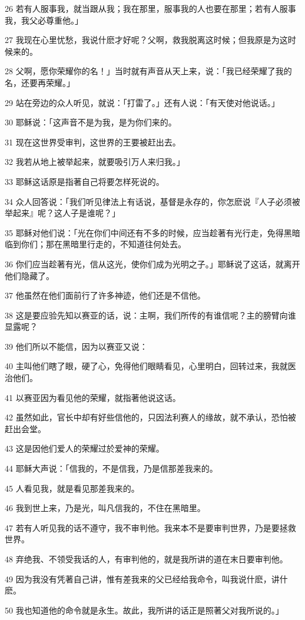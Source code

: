 \par 26 若有人服事我，就当跟从我；我在那里，服事我的人也要在那里；若有人服事我，我父必尊重他。」
\par 27 我现在心里忧愁，我说什麽才好呢？父啊，救我脱离这时候；但我原是为这时候来的。
\par 28 父啊，愿你荣耀你的名！」当时就有声音从天上来，说：「我已经荣耀了我的名，还要再荣耀。」
\par 29 站在旁边的众人听见，就说：「打雷了。」还有人说：「有天使对他说话。」
\par 30 耶稣说：「这声音不是为我，是为你们来的。
\par 31 现在这世界受审判，这世界的王要被赶出去。
\par 32 我若从地上被举起来，就要吸引万人来归我。」
\par 33 耶稣这话原是指著自己将要怎样死说的。
\par 34 众人回答说：「我们听见律法上有话说，基督是永存的，你怎麽说『人子必须被举起来』呢？这人子是谁呢？」
\par 35 耶稣对他们说：「光在你们中间还有不多的时候，应当趁著有光行走，免得黑暗临到你们；那在黑暗里行走的，不知道往何处去。
\par 36 你们应当趁著有光，信从这光，使你们成为光明之子。」耶稣说了这话，就离开他们隐藏了。
\par 37 他虽然在他们面前行了许多神迹，他们还是不信他。
\par 38 这是要应验先知以赛亚的话，说：主啊，我们所传的有谁信呢？主的膀臂向谁显露呢？
\par 39 他们所以不能信，因为以赛亚又说：
\par 40 主叫他们瞎了眼，硬了心，免得他们眼睛看见，心里明白，回转过来，我就医治他们。
\par 41 以赛亚因为看见他的荣耀，就指著他说这话。
\par 42 虽然如此，官长中却有好些信他的，只因法利赛人的缘故，就不承认，恐怕被赶出会堂。
\par 43 这是因他们爱人的荣耀过於爱神的荣耀。
\par 44 耶稣大声说：「信我的，不是信我，乃是信那差我来的。
\par 45 人看见我，就是看见那差我来的。
\par 46 我到世上来，乃是光，叫凡信我的，不住在黑暗里。
\par 47 若有人听见我的话不遵守，我不审判他。我来本不是要审判世界，乃是要拯救世界。
\par 48 弃绝我、不领受我话的人，有审判他的，就是我所讲的道在末日要审判他。
\par 49 因为我没有凭著自己讲，惟有差我来的父已经给我命令，叫我说什麽，讲什麽。
\par 50 我也知道他的命令就是永生。故此，我所讲的话正是照著父对我所说的。」


